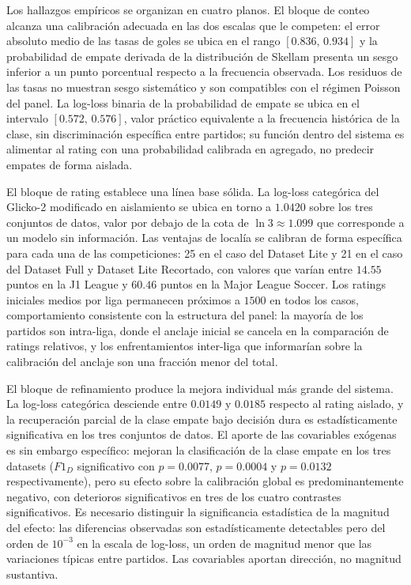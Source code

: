 Los hallazgos emp\'iricos se organizan en cuatro planos. El bloque de conteo alcanza una calibraci\'on adecuada en las dos escalas que le competen: el error absoluto medio de las tasas de goles se ubica en el rango $[0{.}836,\,0{.}934]$ y la probabilidad de empate derivada de la distribuci\'on de Skellam presenta un sesgo inferior a un punto porcentual respecto a la frecuencia observada. Los residuos de las tasas no muestran sesgo sistem\'atico y son compatibles con el r\'egimen Poisson del panel. La log-loss binaria de la probabilidad de empate se ubica en el intervalo $[0{.}572,\,0{.}576]$, valor pr\'actico equivalente a la frecuencia hist\'orica de la clase, sin discriminaci\'on espec\'ifica entre partidos; su funci\'on dentro del sistema es alimentar al rating con una probabilidad calibrada en agregado, no predecir empates de forma aislada.

El bloque de rating establece una l\'inea base s\'olida. La log-loss categ\'orica del Glicko-2 modificado en aislamiento se ubica en torno a $1{.}0420$ sobre los tres conjuntos de datos, valor por debajo de la cota de $\ln 3 \approx 1{.}099$ que corresponde a un modelo sin informaci\'on. Las ventajas de local\'ia se calibran de forma espec\'ifica para cada una de las competiciones: 25 en el caso del Dataset Lite y 21 en el caso del Dataset Full y Dataset Lite Recortado, con valores que var\'ian entre $14{.}55$ puntos en la J1 League y $60{.}46$ puntos en la Major League Soccer. Los ratings iniciales medios por liga permanecen pr\'oximos a $1500$ en todos los casos, comportamiento consistente con la estructura del panel: la mayor\'ia de los partidos son intra-liga, donde el anclaje inicial se cancela en la comparaci\'on de ratings relativos, y los enfrentamientos inter-liga que informar\'ian sobre la calibraci\'on del anclaje son una fracci\'on menor del total.

El bloque de refinamiento produce la mejora individual m\'as grande del sistema. La log-loss categ\'orica desciende entre $0{.}0149$ y $0{.}0185$ respecto al rating aislado, y la recuperaci\'on parcial de la clase empate bajo decisi\'on dura es estad\'isticamente significativa en los tres conjuntos de datos. El aporte de las covariables ex\'ogenas es sin embargo espec\'ifico: mejoran la clasificaci\'on de la clase empate en los tres datasets ($F1_D$ significativo con $p=0{.}0077$, $p=0{.}0004$ y $p=0{.}0132$ respectivamente), pero su efecto sobre la calibraci\'on global es predominantemente negativo, con deterioros significativos en tres de los cuatro contrastes significativos. Es necesario distinguir la significancia estad\'istica de la magnitud del efecto: las diferencias observadas son estad\'isticamente detectables pero del orden de $10^{-3}$ en la escala de log-loss, un orden de magnitud menor que las variaciones t\'ipicas entre partidos. Las covariables aportan direcci\'on, no magnitud sustantiva.

